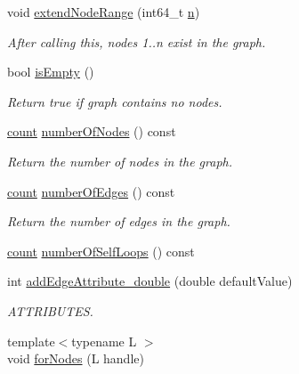\begin{DoxyCompactItemize}
void \hyperlink{class_ensemble_clustering_1_1_graph_a0c9067da83967ec8d49b0ef2c83c9215}{extend\-Node\-Range} (int64\-\_\-t \hyperlink{class_ensemble_clustering_1_1_graph_a025fcfba990314b11b1f27d077b5319a}{n})
\begin{DoxyCompactList}\small\item\em After calling this, nodes 1..n exist in the graph. \end{DoxyCompactList}\item 
bool \hyperlink{class_ensemble_clustering_1_1_graph_afca921e522bef27e1a03e0d9a74160f8}{is\-Empty} ()
\begin{DoxyCompactList}\small\item\em Return true if graph contains no nodes. \end{DoxyCompactList}\item 
\hyperlink{namespace_ensemble_clustering_a2482e94ca22a0c6544a5a9173186fde8}{count} \hyperlink{class_ensemble_clustering_1_1_graph_affe61a24e54266aba872272fb9501c61}{number\-Of\-Nodes} () const 
\begin{DoxyCompactList}\small\item\em Return the number of nodes in the graph. \end{DoxyCompactList}\item 
\hyperlink{namespace_ensemble_clustering_a2482e94ca22a0c6544a5a9173186fde8}{count} \hyperlink{class_ensemble_clustering_1_1_graph_ab019840b239c3247eaf00e5ffcc6bb03}{number\-Of\-Edges} () const 
\begin{DoxyCompactList}\small\item\em Return the number of edges in the graph. \end{DoxyCompactList}\item 
\hyperlink{namespace_ensemble_clustering_a2482e94ca22a0c6544a5a9173186fde8}{count} \hyperlink{class_ensemble_clustering_1_1_graph_af4556a26cff9aa362b3a38490922c862}{number\-Of\-Self\-Loops} () const 
\item 
int \hyperlink{class_ensemble_clustering_1_1_graph_a23025f5bf30bb84ab4fe97d35d40b69c}{add\-Edge\-Attribute\-\_\-double} (double default\-Value)
\begin{DoxyCompactList}\small\item\em A\-T\-T\-R\-I\-B\-U\-T\-E\-S. \end{DoxyCompactList}\item 
{\footnotesize template$<$typename L $>$ }\\void \hyperlink{class_ensemble_clustering_1_1_graph_a345e16f8c997d2113dc5bf7b2e818d36}{for\-Nodes} (L handle)

\end{DoxyCompactItemize}
